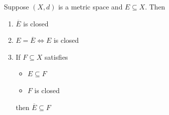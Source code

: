 \bigskip

\begin{theorem} \label{an:thm:properties-of-closure}
  Suppose $(X, d)$ is a metric space and $E \subseteq X$. Then
  \begin{enumerate}[label=\textbf{(\Alph*)}]
    \item $\overline{E}$ is closed
    \item $E = \overline{E} \iff E$ is closed
    \item If $F \subseteq X$ satisfies
          \begin{itemize}
            \item $E \subseteq F$
            \item $F$ is closed
          \end{itemize}
          then $\overline{E} \subseteq F$
  \end{enumerate}
\end{theorem}

